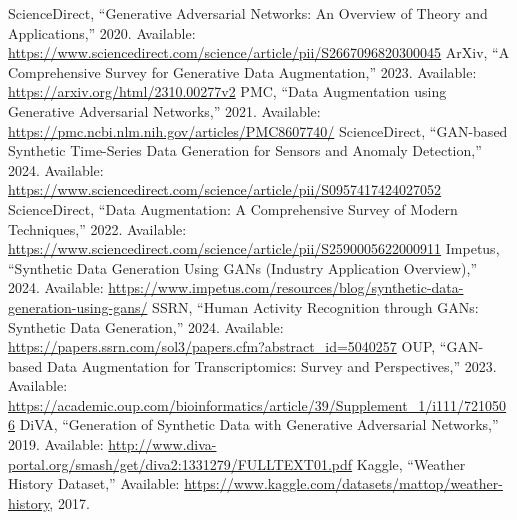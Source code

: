 \documentclass[12pt, draftclsnofoot, onecolumn]{IEEEtran}
\begin{document}
\begin{thebibliography}{99}
 ScienceDirect, ``Generative Adversarial Networks: An Overview of Theory and Applications,'' 2020. Available: \url{https://www.sciencedirect.com/science/article/pii/S2667096820300045}
 ArXiv, ``A Comprehensive Survey for Generative Data Augmentation,'' 2023. Available: \url{https://arxiv.org/html/2310.00277v2}
 PMC, ``Data Augmentation using Generative Adversarial Networks,'' 2021. Available: \url{https://pmc.ncbi.nlm.nih.gov/articles/PMC8607740/}
 ScienceDirect, ``GAN-based Synthetic Time-Series Data Generation for Sensors and Anomaly Detection,'' 2024. Available: \url{https://www.sciencedirect.com/science/article/pii/S0957417424027052}
 ScienceDirect, ``Data Augmentation: A Comprehensive Survey of Modern Techniques,'' 2022. Available: \url{https://www.sciencedirect.com/science/article/pii/S2590005622000911}
 Impetus, ``Synthetic Data Generation Using GANs (Industry Application Overview),'' 2024. Available: \url{https://www.impetus.com/resources/blog/synthetic-data-generation-using-gans/}
 SSRN, ``Human Activity Recognition through GANs: Synthetic Data Generation,'' 2024. Available: \url{https://papers.ssrn.com/sol3/papers.cfm?abstract_id=5040257}
 OUP, ``GAN-based Data Augmentation for Transcriptomics: Survey and Perspectives,'' 2023. Available: \url{https://academic.oup.com/bioinformatics/article/39/Supplement_1/i111/7210506}
 DiVA, ``Generation of Synthetic Data with Generative Adversarial Networks,'' 2019. Available: \url{http://www.diva-portal.org/smash/get/diva2:1331279/FULLTEXT01.pdf}
 Kaggle, ``Weather History Dataset,'' Available: \url{https://www.kaggle.com/datasets/mattop/weather-history}, 2017.


\end{thebibliography}
\end{document}
